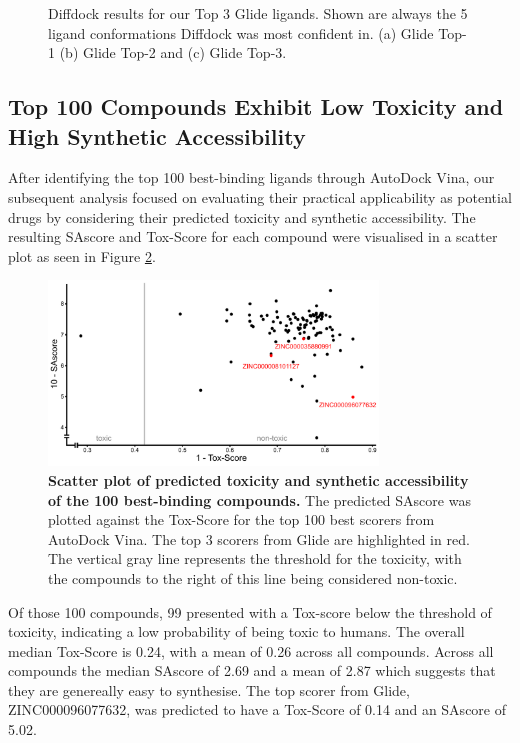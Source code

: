 \documentclass[11pt, letterpaper, titlepage]{article}
\begin{document}
\begin{figure}[h]
	\caption{Diffdock results for our Top 3 Glide ligands. Shown are always the 5 ligand conformations Diffdock was most confident in. (a) Glide Top-1 (b) Glide Top-2 and (c) Glide Top-3.}\label{pymol_Top3}
\end{figure}

\subsection{Top 100 Compounds Exhibit Low Toxicity and High Synthetic Accessibility}
After identifying the top 100 best-binding ligands through AutoDock Vina, our subsequent analysis focused on evaluating their practical applicability as potential drugs by considering their predicted toxicity and synthetic accessibility. The resulting SAscore and Tox-Score for each compound were visualised in a scatter plot as seen in {Figure \ref{eToxPred}}. 

\begin{figure}[h]
    \begin{center}
      \includegraphics[width=0.78\textwidth]{etoxpred_result.pdf}
    \end{center}
    \caption{\textbf{Scatter plot of predicted toxicity and synthetic accessibility of the 100 best-binding compounds.} The predicted \ac{SAscore} was plotted against the Tox-Score for the top 100 best scorers from AutoDock Vina. The top 3 scorers from Glide are highlighted in red. The vertical gray line represents the threshold for the toxicity, with the compounds to the right of this line being considered non-toxic.}\label{eToxPred}
  \end{figure}

\noindent Of those 100 compounds, 99 presented with a Tox-score below the threshold of toxicity, indicating a low probability of being toxic to humans. The overall median Tox-Score is 0.24, with a mean of 0.26 across all compounds. Across all compounds the median SAscore of 2.69 and a mean of 2.87 which suggests that they are genereally easy to synthesise. The top scorer from Glide, ZINC000096077632, was predicted to have a Tox-Score of 0.14 and an SAscore of 5.02.
\end{document}
